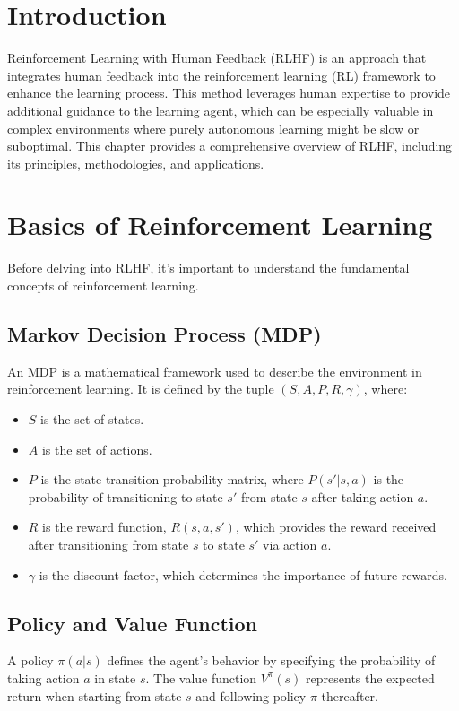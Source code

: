 \section{Introduction}
Reinforcement Learning with Human Feedback (RLHF) is an approach that integrates human feedback into the reinforcement learning (RL) framework to enhance the learning process. This method leverages human expertise to provide additional guidance to the learning agent, which can be especially valuable in complex environments where purely autonomous learning might be slow or suboptimal. This chapter provides a comprehensive overview of RLHF, including its principles, methodologies, and applications.

\section{Basics of Reinforcement Learning}
Before delving into RLHF, it's important to understand the fundamental concepts of reinforcement learning.

\subsection{Markov Decision Process (MDP)}
An MDP is a mathematical framework used to describe the environment in reinforcement learning. It is defined by the tuple \((S, A, P, R, \gamma)\), where:
\begin{itemize}
    \item \(S\) is the set of states.
    \item \(A\) is the set of actions.
    \item \(P\) is the state transition probability matrix, where \(P(s'|s, a)\) is the probability of transitioning to state \(s'\) from state \(s\) after taking action \(a\).
    \item \(R\) is the reward function, \(R(s, a, s')\), which provides the reward received after transitioning from state \(s\) to state \(s'\) via action \(a\).
    \item \(\gamma\) is the discount factor, which determines the importance of future rewards.
\end{itemize}

\subsection{Policy and Value Function}
A policy \(\pi(a|s)\) defines the agent's behavior by specifying the probability of taking action \(a\) in state \(s\). The value function \(V^\pi(s)\) represents the expected return when starting from state \(s\) and following policy \(\pi\) thereafter.


